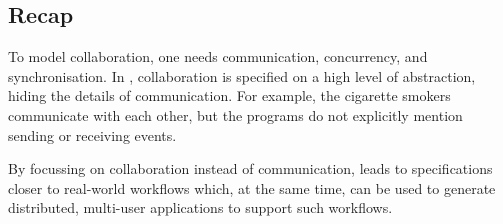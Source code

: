 \subsection{Recap}

To model collaboration, one needs communication, concurrency, and synchronisation.
In \TOP, collaboration is specified on a high level of abstraction, hiding the details of communication.
For example, the cigarette smokers communicate with each other, but the programs do not explicitly mention sending or receiving events.

By focussing on collaboration instead of communication, \TOP leads to specifications closer to real-world workflows which, at the same time, can be used to generate distributed, multi-user applications to support such workflows.
